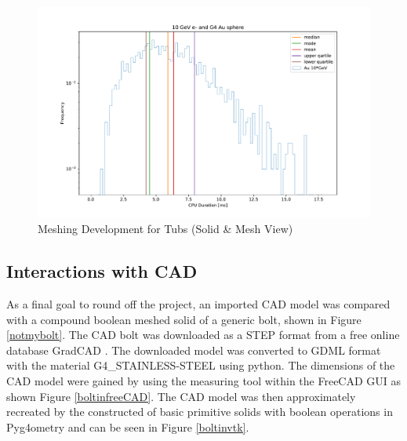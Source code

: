 \documentclass[12pt,a4paper]{article}
\begin{document}
\begin{figure}[h!]
\centering
\includegraphics[scale=0.4]{Images//Materials//Time_ex_dists.pdf}
\caption[width=\columnwidth]{Meshing Development for Tubs (Solid \& Mesh View)}
\label{tubspic}
\end{figure}

%
%

\subsection{Interactions with CAD}
As a final goal to round off the project, an imported CAD model was compared with a compound boolean meshed solid of a generic bolt, shown in Figure
\ref{notmybolt}. The CAD bolt was downloaded as a STEP format from a free online database GradCAD \cite{cadmag}. The downloaded model was converted to GDML format with the material G4\_STAINLESS-STEEL using python. The dimensions of the CAD model were gained by using the measuring tool within the FreeCAD GUI as shown Figure \ref{boltinfreeCAD}. The CAD model was then approximately recreated by the constructed of basic primitive solids with boolean operations in Pyg4ometry and can be seen in Figure \ref{boltinvtk}.
\end{document}
